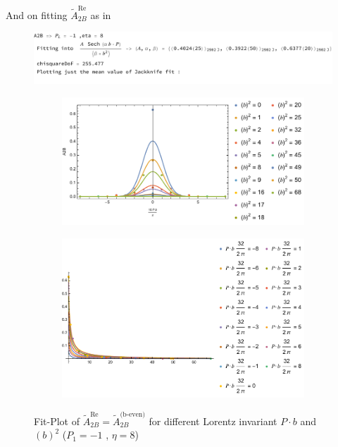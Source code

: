 \documentclass[]{article}
\numberwithin{equation}{section}
\newcommand{\tAmp}{\widetilde{A}}
\newcommand{\tAmp}{\ensuremath{\widetilde{A}^{(+)}}}
\begin{document}
And on fitting $\tAmp_{2B}^{\text{Re}}$ as in
\begin{figure}[h!]
    \centering
    \includegraphics[width=0.8\linewidth]{fitA2B.pdf}
\end{figure}
\begin{figure}[h!]
     \centering
     \begin{subfigure}[b]{0.45\textwidth}
         \centering
         \includegraphics[width=\textwidth]{Pbfit_A2B_b_bnum_P1_-1_eta_8.pdf}
     \end{subfigure}
     \begin{subfigure}[b]{0.45\textwidth}
         \centering
         \includegraphics[width=\textwidth]{bsqfit_A2B_b_bnum_P1_-1_eta_8.pdf}
     \end{subfigure}
        \caption{Fit-Plot of $\tAmp^{\text{Re}}_{2B}=\tAmp^{\text{(b-even)}}_{2B}$ for different Lorentz invariant $P\cdot b$ and $(b)^2$  ($P_{1} = -1$ , $\eta=8$)}
\end{figure}
\end{document}
